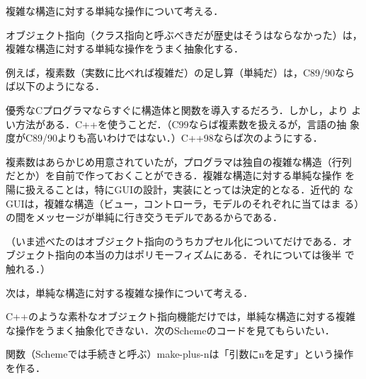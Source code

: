 \documentclass[a5paper,twoside,fleqn,draft]{jsbook}
\def\varColor{NavyBlue}
\newcommand{\mVar}[1]{\textcolor{\varColor}{#1}}
\newcommand{\mZVar}{\mVar{z}}
\begin{document}
複雑な構造に対する単純な操作について考える．

オブジェクト指向（クラス指向と呼ぶべきだが歴史はそうはならなかった）は，
複雑な構造に対する単純な操作をうまく抽象化する．

例えば，複素数（実数に比べれば複雑だ）の足し算（単純だ）は，C89/90なら
ば以下のようになる．


優秀なCプログラマならすぐに構造体と関数を導入するだろう．しかし，より
よい方法がある．C++を使うことだ．（C99ならば複素数を扱えるが，言語の抽
  象度がC89/90よりも高いわけではない．）C++98ならば次のようにする．


複素数はあらかじめ用意されていたが，プログラマは独自の複雑な構造（行列
だとか）を自前で作っておくことができる．複雑な構造に対する単純な操作
を陽に扱えることは，特にGUIの設計，実装にとっては決定的となる．近代的
なGUIは，複雑な構造（ビュー，コントローラ，モデルのそれぞれに当てはま
る）の間をメッセージが単純に行き交うモデルであるからである．

（いま述べたのはオブジェクト指向のうちカプセル化についてだけである．オ
ブジェクト指向の本当の力はポリモーフィズムにある．それについては後半
で触れる．）

次は，単純な構造に対する複雑な操作について考える．

C++のような素朴なオブジェクト指向機能だけでは，単純な構造に対する複雑
な操作をうまく抽象化できない．次のSchemeのコードを見てもらいたい．


関数（Schemeでは手続きと呼ぶ）make-plus-nは「引数にnを足す」という操作
を作る．

\end{document}
